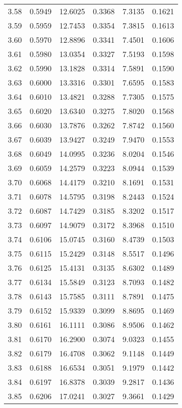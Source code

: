 \documentclass{article}
\begin{document}
\begin{longtable}{cccccc}
3.58 & 0.5949 & 12.6025 & 0.3368 & 7.3135 & 0.1621 \\
3.59 & 0.5959 & 12.7453 & 0.3354 & 7.3815 & 0.1613 \\
3.60 & 0.5970 & 12.8896 & 0.3341 & 7.4501 & 0.1606 \\
3.61 & 0.5980 & 13.0354 & 0.3327 & 7.5193 & 0.1598 \\
3.62 & 0.5990 & 13.1828 & 0.3314 & 7.5891 & 0.1590 \\
3.63 & 0.6000 & 13.3316 & 0.3301 & 7.6595 & 0.1583 \\
3.64 & 0.6010 & 13.4821 & 0.3288 & 7.7305 & 0.1575 \\
3.65 & 0.6020 & 13.6340 & 0.3275 & 7.8020 & 0.1568 \\
3.66 & 0.6030 & 13.7876 & 0.3262 & 7.8742 & 0.1560 \\
3.67 & 0.6039 & 13.9427 & 0.3249 & 7.9470 & 0.1553 \\
3.68 & 0.6049 & 14.0995 & 0.3236 & 8.0204 & 0.1546 \\
3.69 & 0.6059 & 14.2579 & 0.3223 & 8.0944 & 0.1539 \\
3.70 & 0.6068 & 14.4179 & 0.3210 & 8.1691 & 0.1531 \\
3.71 & 0.6078 & 14.5795 & 0.3198 & 8.2443 & 0.1524 \\
3.72 & 0.6087 & 14.7429 & 0.3185 & 8.3202 & 0.1517 \\
3.73 & 0.6097 & 14.9079 & 0.3172 & 8.3968 & 0.1510 \\
3.74 & 0.6106 & 15.0745 & 0.3160 & 8.4739 & 0.1503 \\
3.75 & 0.6115 & 15.2429 & 0.3148 & 8.5517 & 0.1496 \\
3.76 & 0.6125 & 15.4131 & 0.3135 & 8.6302 & 0.1489 \\
3.77 & 0.6134 & 15.5849 & 0.3123 & 8.7093 & 0.1482 \\
3.78 & 0.6143 & 15.7585 & 0.3111 & 8.7891 & 0.1475 \\
3.79 & 0.6152 & 15.9339 & 0.3099 & 8.8695 & 0.1469 \\
3.80 & 0.6161 & 16.1111 & 0.3086 & 8.9506 & 0.1462 \\
3.81 & 0.6170 & 16.2900 & 0.3074 & 9.0323 & 0.1455 \\
3.82 & 0.6179 & 16.4708 & 0.3062 & 9.1148 & 0.1449 \\
3.83 & 0.6188 & 16.6534 & 0.3051 & 9.1979 & 0.1442 \\
3.84 & 0.6197 & 16.8378 & 0.3039 & 9.2817 & 0.1436 \\
3.85 & 0.6206 & 17.0241 & 0.3027 & 9.3661 & 0.1429 \\

\end{longtable}
\end{document}
